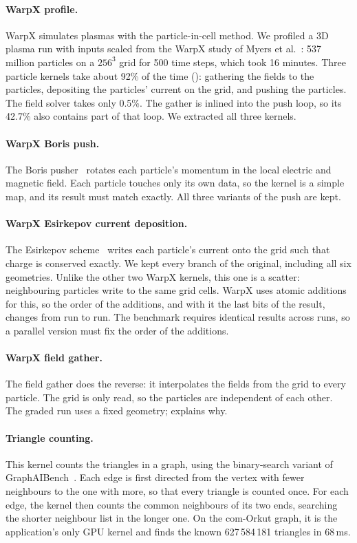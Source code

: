 \paragraph{WarpX profile.}
WarpX simulates plasmas with the particle-in-cell method. We profiled a 3D plasma run with
inputs scaled from the WarpX study of Myers et al.~\cite{myers2021warpx}: 537 million particles
on a $256^3$ grid for 500 time steps, which took 16 minutes. Three particle kernels take about
92\% of the time (): gathering the fields to the particles, depositing the
particles' current on the grid, and pushing the particles. The field solver takes only 0.5\%.
The gather is inlined into the push loop, so its 42.7\% also contains part of that loop. We
extracted all three kernels.

\paragraph{WarpX Boris push.}
The Boris pusher~\cite{boris1970} rotates each particle's momentum in the local electric and
magnetic field. Each particle touches only its own data, so the kernel is a simple map, and its
result must match exactly. All three variants of the push are kept.

\paragraph{WarpX Esirkepov current deposition.}
The Esirkepov scheme~\cite{esirkepov2001} writes each particle's current onto the grid such that
charge is conserved exactly. We kept every branch of the original, including all six
geometries. Unlike the other two WarpX kernels, this one is a scatter: neighbouring particles
write to the same grid cells. WarpX uses atomic additions for this, so the order of the
additions, and with it the last bits of the result, changes from run to run. The benchmark
requires identical results across runs, so a parallel version must fix the order of the
additions.

\paragraph{WarpX field gather.}
The field gather does the reverse: it interpolates the fields from the grid to every particle.
The grid is only read, so the particles are independent of each other. The graded run uses a
fixed geometry;  explains why.

\paragraph{Triangle counting.}
This kernel counts the triangles in a graph, using the binary-search variant of
GraphAIBench~\cite{graphaibench}. Each edge is first directed from the vertex with fewer
neighbours to the one with more, so that every triangle is counted once. For each edge, the
kernel then counts the common neighbours of its two ends, searching the shorter neighbour list
in the longer one. On the com-Orkut graph, it is the application's only GPU kernel and finds
the known 627\,584\,181 triangles in 68\,ms.

